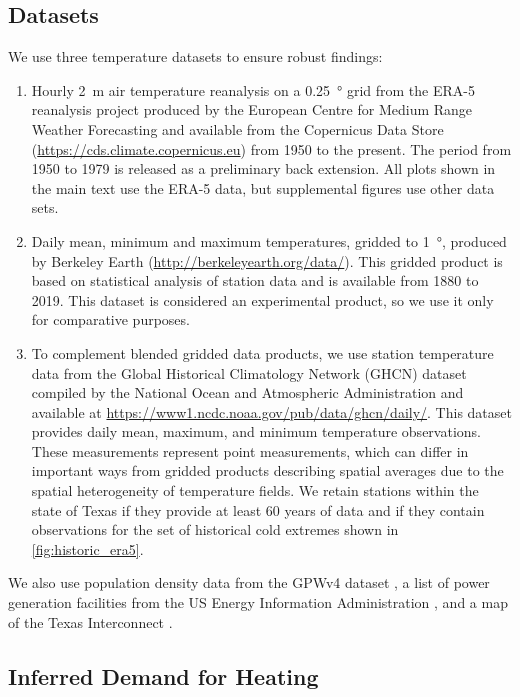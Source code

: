 \documentclass[12pt]{iopart}
\begin{document}
\subsection{Datasets}

We use three temperature datasets to ensure robust findings:
\begin{enumerate}
  \item Hourly \SI{2}{\meter} air temperature reanalysis on a \SI{0.25}{\degree} grid from the ERA-5 reanalysis project produced by the European Centre for Medium Range Weather Forecasting \cite{hersbach_era5:2020} and available  from the Copernicus Data Store (\url{https://cds.climate.copernicus.eu}) from 1950 to the present.
        The period from 1950 to 1979 is released as a preliminary back extension.
        All plots shown in the main text use the ERA-5 data, but supplemental figures use other data sets.
  \item Daily mean, minimum and maximum temperatures, gridded to \SI{1}{\degree}, produced by Berkeley Earth (\url{http://berkeleyearth.org/data/}).
        This gridded product is based on statistical analysis of station data and is available from 1880 to 2019.
        This dataset is considered an experimental product, so we use it only for comparative purposes.
  \item To complement blended gridded data products, we use station temperature data from the Global Historical Climatology Network (GHCN) dataset compiled by the National Ocean and Atmospheric Administration \cite{Menne:2012hk} and available at \url{https://www1.ncdc.noaa.gov/pub/data/ghcn/daily/}.
        This dataset provides daily mean, maximum, and minimum temperature observations.
        These measurements represent point measurements, which can differ in important ways from gridded products describing spatial averages due to the spatial heterogeneity of temperature fields.
        We retain stations within the state of Texas if they provide at least 60 years of data and if they contain observations for the set of historical cold extremes shown in \cref{fig:historic_era5}.
\end{enumerate}
We also use population density data from the GPWv4 dataset \cite{ciesin_gpwv4:2016}, a list of power generation facilities from the US Energy Information Administration \cite{useia_generators:2021}, and a map of the Texas Interconnect \cite{useia_regions:2021}.


\subsection{Inferred Demand for Heating}\label{sec:inferred-demand}
\end{document}
